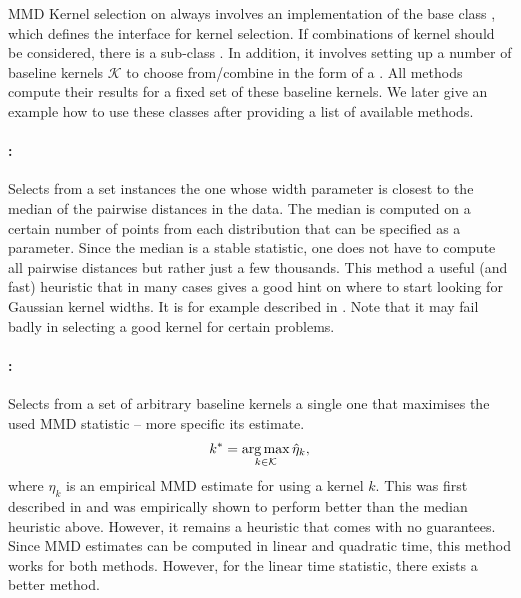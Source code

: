MMD Kernel selection on \shogun{} always involves an implementation of the base class , which defines the interface for kernel selection. If combinations of kernel should be considered, there is a sub-class . In addition, it involves setting up a number of baseline kernels $\mathcal{K}$ to choose from/combine in the form of a . All methods compute their results for a fixed set of these baseline kernels. We later give an example how to use these classes after providing a list of available methods.

\paragraph{:} Selects from a set  instances the one whose width parameter is closest to the median of the pairwise distances in the data. The median is computed on a certain number of points from each distribution that can be specified as a parameter. Since the median is a stable statistic, one does not have to compute all pairwise distances but rather just a few thousands. This method a useful (and fast) heuristic that in many cases gives a good hint on where to start looking for Gaussian kernel widths. It is for example described in \citep{Gretton2012}. Note that it may fail badly in selecting a good kernel for certain problems.

\paragraph{:} Selects from a set of arbitrary baseline kernels a single one that maximises the used MMD statistic -- more specific its estimate.
\begin{align*}
k^*=\operatorname*{arg\,max}_{k\in\mathcal{K}} \hat \eta_k,
\end{align*}
where $\eta_k$ is an empirical MMD estimate for using a kernel $k$.
This was first described in \cite{Sriperumbudur2009} and was empirically shown to perform better than the median heuristic above. However, it remains a heuristic that comes with no guarantees. Since MMD estimates can be computed in linear and quadratic time, this method works for both methods. However, for the linear time statistic, there exists a better method.
 
